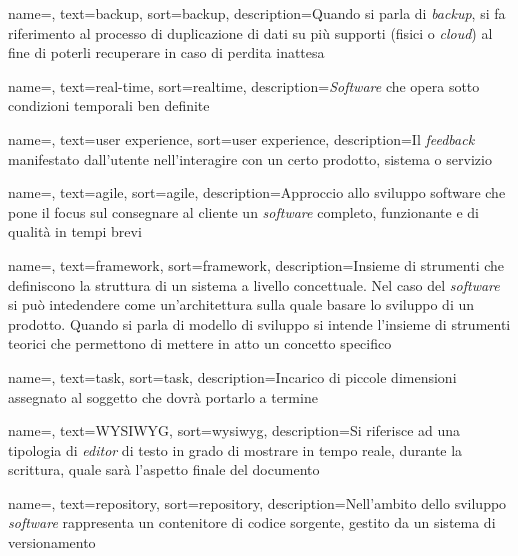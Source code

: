 {
    name=,
    text=backup,
    sort=backup,
    description={Quando si parla di \textit{backup}, si fa riferimento al processo di duplicazione di dati su più supporti (fisici o \textit{cloud}) al fine di poterli recuperare in caso di perdita inattesa}
}

{
    name=,
    text=real-time,
    sort=realtime,
    description={\textit{Software} che opera sotto condizioni temporali ben definite}
}

{
    name=,
    text=user experience,
    sort=user experience,
    description={Il \textit{feedback} manifestato dall'utente nell'interagire con un certo prodotto, sistema o servizio}
}

{
    name=,
    text=agile,
    sort=agile,
    description={Approccio allo sviluppo software che pone il focus sul consegnare al cliente un \textit{software} completo, funzionante  e di qualità in tempi brevi}
}

{
    name=,
    text=framework,
    sort=framework,
    description={Insieme di strumenti che definiscono la struttura di un sistema a livello concettuale. Nel caso del \textit{software} si può intedendere come un'architettura sulla quale basare lo sviluppo di un prodotto. Quando si parla di modello di sviluppo si intende l'insieme di strumenti teorici che permettono di mettere in atto un concetto specifico}
}

{
    name=,
    text=task,
    sort=task,
    description={Incarico di piccole dimensioni assegnato al soggetto che dovrà portarlo a termine}
}

{
    name=,
    text=WYSIWYG,
    sort=wysiwyg,
    description={Si riferisce ad una tipologia di \textit{editor} di testo in grado di mostrare in tempo reale, durante la scrittura, quale sarà l'aspetto finale del documento}
}

{
    name=,
    text=repository,
    sort=repository,
    description={Nell'ambito dello sviluppo \textit{software} rappresenta un contenitore di codice sorgente, gestito da un sistema di versionamento}
}

